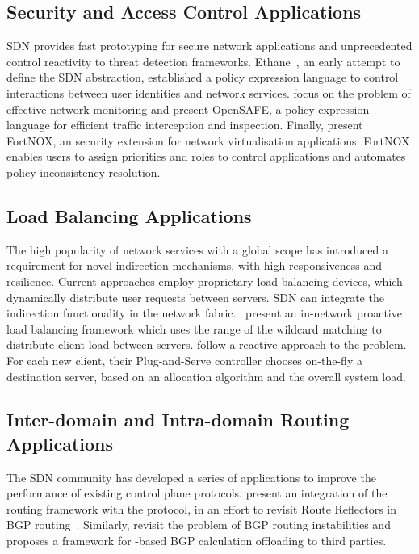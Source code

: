 \subsection{Security and Access Control Applications}

SDN provides fast  prototyping for secure network applications and
unprecedented control reactivity to threat detection frameworks.
Ethane~, an  early attempt to define the SDN
abstraction, established a policy expression language to control interactions
between user identities and network services.   focus on the
problem of effective network monitoring and present OpenSAFE, a policy
expression language for efficient traffic interception and inspection.  Finally,
 present FortNOX, an security extension  for network
virtualisation applications. FortNOX enables users to assign priorities and
roles to control applications and automates policy inconsistency resolution.

\subsection{Load Balancing Applications}

The high popularity of network services with a global scope has introduced a
requirement for novel indirection mechanisms, with high responsiveness and
resilience. Current approaches employ proprietary load balancing devices, which
dynamically distribute user requests between servers.  SDN can integrate the
indirection functionality in the network fabric. ~present an
in-network proactive load balancing framework which uses the range of the \of
wildcard matching to distribute client load between servers.
 follow a reactive approach to the problem. For
each new client, their Plug-and-Serve controller chooses on-the-fly a
destination server, based on an allocation algorithm and the overall system
load.

\subsection{Inter-domain and Intra-domain Routing Applications}

The SDN community has developed a series of applications to improve the
performance of existing control plane protocols.   present
an integration of the 
 routing framework with the \of protocol, in an effort to
revisit Route Reflectors in BGP routing~. Similarly,
 revisit the problem of BGP routing instabilities and
proposes a framework for \of-based BGP calculation offloading to third parties.

